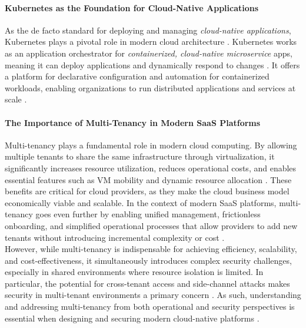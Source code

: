 \documentclass[11pt, a4paper, oneside, draft]{scrartcl}
\begin{document}
            \paragraph{Kubernetes as the Foundation for Cloud-Native Applications}
                As the de facto standard for deploying and managing 
                \textit{cloud-native applications}, Kubernetes plays a pivotal role in modern cloud
                architecture \parencite[p.~7--8]{poulton2021}.
                Kubernetes works as an application orchestrator for \textit{containerized,
                cloud-native microservice} apps, meaning it can deploy applications and dynamically
                respond to changes \parencite[p.~3]{poulton2021}.
                It offers a platform for declarative configuration and automation for containerized
                workloads, enabling organizations to run distributed applications and services at
                scale \parencite{kubernetesOverview,redhatWhatIsKubernetes}.

            \paragraph{The Importance of Multi-Tenancy in Modern SaaS Platforms}
                Multi-tenancy plays a fundamental role in modern cloud computing. 
                By allowing multiple tenants to share the same infrastructure through
                virtualization, it significantly increases resource utilization, reduces operational
                costs, and enables essential features such as VM mobility and dynamic resource
                allocation \parencite[pp.~345--346]{IEEEMultiTenancySecurityConcerns}. 
                These benefits are critical for cloud providers, as they make the cloud business
                model economically viable and scalable. 
                In the context of modern SaaS platforms, multi-tenancy goes even further by enabling
                unified management, frictionless onboarding, and simplified operational processes
                that allow providers to add new tenants without introducing incremental complexity
                or cost \parencite[pp.~9--11]{awsSaaSArchitectureFundamentals}.
                \\
                However, while multi-tenancy is indispensable for achieving efficiency, scalability,
                and cost-effectiveness, it simultaneously introduces complex security challenges,
                especially in shared environments where resource isolation is limited. 
                In particular, the potential for cross-tenant access and side-channel attacks makes
                security in multi-tenant environments a primary concern
                \parencite[pp.~345--346]{IEEEMultiTenancySecurityConcerns}. 
                As such, understanding and addressing multi-tenancy from both operational and
                security perspectives is essential when designing and securing modern cloud-native
                platforms
                \parencites[pp.~9--11]{awsSaaSArchitectureFundamentals}[p.~4]{isoConcepts}.
\end{document}
